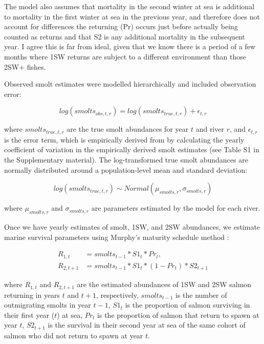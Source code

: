 \documentclass[12pt]{article}
\newcommand{\comment}[1]{\par {\bfseries \color{blue} #1 \par}} %
\begin{document}
The model also assumes that mortality in the second winter at sea 
is additional to mortality in the first winter at sea in the previous year, 
and therefore does not account for differences
the returning (Pr) occurs just before
actually being counted as returns and that S2 is any additional mortality in
the subsequent year. I agree this is far from ideal, given that we know there
is a period of a few months where 1SW returns are subject to a different
environment than those 2SW+ fishes. 


Observed smolt estimates were modelled hierarchically and included
observation error:

\begin{equation}
log(smolts_{obs,t,r}) = log(smolts_{true,t,r}) + \epsilon_{t,r}
\end{equation}

where $smolts_{true,t,r}$ are the true smolt abundances for year $t$ and river
$r$, and $\epsilon_{t,r}$ is the error term, which is empirically derived from
by calculating the yearly coefficient of variation in the empirically derived
smolt estimates (see Table S1 in the Supplementary material). 
The log-transformed true smolt abundances are
normally distributed around a population-level mean and standard deviation:

\begin{equation}
log(smolts_{true,t,r}) \sim Normal(\mu_{smolts,r}, \sigma_{smolts,r})
\end{equation}

where $\mu_{smolts,r}$ and $\sigma_{smolts,r}$ are parameters estimated by the
model for each river.

Once we have yearly estimates of smolt, 1SW, and 2SW abundances, we estimate
marine survival parameters using Murphy's maturity schedule method
\citep{Murphy1952, Ricker1975}:

\begin{align}
    R_{1,t} &= smolts_{t-1} * S1_t * Pr_t \label{eq:1}, \\
    R_{2,t+1} &= smolts_{t-1} * S1_t * (1 - Pr_t) * S2_{t+1} \label{eq:2}
\end{align}

where $R_{1,t}$ and $R_{2,t+1}$ are the estimated abundances of 1SW and 2SW
salmon returning in years $t$ and $t+1$, respectively, $smolts_{t-1}$ is the
number of outmigrating smolts in year $t-1$, $S1_t$ is the proportion of
salmon surviving in their first year ($t$) at sea, $Pr_t$ is the proportion of
salmon that return to spawn at year $t$, $S2_{t+1}$ is the survival in their
second year at sea of the same cohort of salmon who did not return to spawn at
year $t$.
\end{document}
